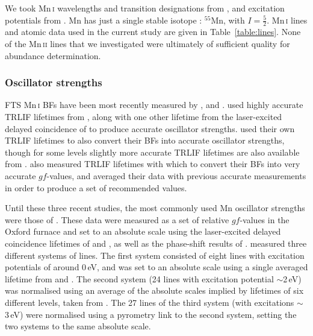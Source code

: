 \documentclass[traditabstract]{aa}
\begin{document}
We took Mn\,\textsc{i} wavelengths and transition designations from \citet{Adelman89}, and excitation potentials from \citet{Corliss77}.  Mn has just a single stable isotope \citep{IUPAC98}: $^{55}$Mn, with $I=\frac{5}{2}$.  Mn\,\textsc{i} lines and atomic data used in the current study are given in Table~\ref{table:lines}.  None of the Mn\,\textsc{ii} lines that we investigated were ultimately of sufficient quality for abundance determination.

\subsubsection{Oscillator strengths}
\label{Mngfs}

FTS Mn\,\textsc{i} BFs have been most recently measured by \citet{DenHartog11}, \citet{BW07} and \citet{BW05b}.  \citet{BW07} used highly accurate TRLIF lifetimes from \citet{Schnabel95}, along with one other lifetime from the laser-excited delayed coincidence of \citet{Marek75} to produce accurate oscillator strengths.  \citet{BW05b} used their own TRLIF lifetimes to also convert their BFs into accurate oscillator strengths, though for some levels slightly more accurate TRLIF lifetimes are also available from \citet{Schnabel95}.  \citet{DenHartog11} also measured TRLIF lifetimes with which to convert their BFs into very accurate $gf$-values, and averaged their data with previous accurate measurements in order to produce a set of recommended values.

Until these three recent studies, the most commonly used Mn oscillator strengths were those of \citet{Booth84c}.  These data were measured
as a set of relative $gf$-values in the Oxford furnace and set to an absolute scale using the laser-excited delayed coincidence
lifetimes of \citet{Becker80} and \citet{Marek75}, as well as the phase-shift results of \citet{Marek73}.
\citet{Booth84c} measured three different systems of lines. 
The first system consisted of eight lines with excitation potentials of around \mbox{0\,eV}, and was set to an
absolute scale using a single averaged lifetime from \citet{Marek75} and \citet{Marek73}.  The second system (24 lines
with excitation potential \mbox{$\sim$2\,eV}) was normalised using an average of the absolute scales implied by lifetimes of six
different levels, taken from \citet{Becker80}.  
The 27 lines of the third system (with excitations \mbox{$\sim$3\,eV})
were normalised using a pyrometry link to the second system, setting the two systems to the same absolute scale.
\end{document}
